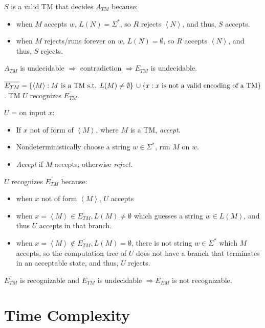 \documentclass[10pt,landscape,a4paper]{article}
\newcommand{\set}[1]{\left \{ #1 \right \}}
\newcommand{\encoding}[1]{\left \langle #1 \right \rangle}
\begin{document}
\begin{multicols*}{3}
$S$ is a valid TM that decides $A_{TM}$ because:

\begin{itemize}
    \item when $M$ accepts $w$, $L(N) = \Sigma^*$, so $R$ rejects $\encoding{N}$, and thus, $S$ accepts.
    \item when $M$ rejects/runs forever on $w$, $L(N) = \emptyset$, so $R$ accepts $\encoding{N}$, and thus, $S$ rejects.
\end{itemize}

$A_{TM}$ is undecidable $\Rightarrow$ contradiction $\Rightarrow E_{TM}$ is undecidable.

$\overline{E_{TM}}= \set{\encoding{M}: M \text{ is a TM s.t. } L(M) \neq \emptyset} \\ \cup \set{x: x \text{ is not a valid encoding of a TM}}$. TM $U$ recognizes $\overline{E_{TM}}$.

$U$ = on input $x$:

\begin{itemize}
    \item If $x$ not of form of $\encoding{M}$, where $M$ is a TM, \emph{accept}.
    \item Nondeterministically choose a string $w \in \Sigma^*$, run $M$ on $w$.
    \item \emph{Accept} if $M$ accepts; otherwise \emph{reject}.
\end{itemize}

$U$ recognizes $\overline{E_{TM}}$ because:

\begin{itemize}
    \item when $x$ not of form $\encoding{M}$, $U$ accepts
    \item when $x = \encoding{M} \in \overline{E_{TM}}, L(M) \neq \emptyset$ which guesses a string $w \in L(M)$, and thus $U$ accepts in that branch.
    \item when $x = \encoding{M} \notin \overline{E_{TM}}, L(M) = \emptyset$, there is not string $w \in \Sigma^*$ which $M$ accepts, so the computation tree of $U$ does not have a branch that terminates in an acceptable state, and thus, $U$ rejects.
\end{itemize}

$\overline{E_{TM}}$ is recognizable and $E_{TM}$ is undecidable $\Rightarrow E_{EM}$ is not recognizable.

\section{Time Complexity}


\end{multicols*}
\end{document}
